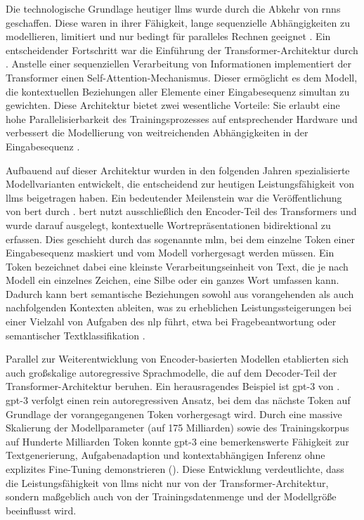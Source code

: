 Die technologische Grundlage heutiger \glspl{llm} wurde durch die Abkehr von \glspl{rnn} geschaffen.
Diese waren in ihrer Fähigkeit, lange sequenzielle Abhängigkeiten zu modellieren, limitiert und nur bedingt für paralleles Rechnen geeignet \autocite{vaswani_attention_2023}.
Ein entscheidender Fortschritt war die Einführung der Transformer-Architektur durch \citeauthor{vaswani_attention_2023} \autocite{vaswani_attention_2023}.
Anstelle einer sequenziellen Verarbeitung von Informationen implementiert der Transformer einen Self-Attention-Mechanismus.
Dieser ermöglicht es dem Modell, die kontextuellen Beziehungen aller Elemente einer Eingabesequenz simultan zu gewichten.
Diese Architektur bietet zwei wesentliche Vorteile: Sie erlaubt eine hohe Parallelisierbarkeit des Trainingsprozesses auf entsprechender Hardware und verbessert die Modellierung von weitreichenden Abhängigkeiten in der Eingabesequenz \autocite{vaswani_attention_2023}.

Aufbauend auf dieser Architektur wurden in den folgenden Jahren spezialisierte Modellvarianten entwickelt, die entscheidend zur heutigen Leistungsfähigkeit von \glspl{llm} beigetragen haben.
Ein bedeutender Meilenstein war die Veröffentlichung von \gls{bert} durch \citeauthor{devlin_bert_2019} \autocite{devlin_bert_2019}.
\gls{bert} nutzt ausschließlich den Encoder-Teil des Transformers und wurde darauf ausgelegt, kontextuelle Wortrepräsentationen bidirektional zu erfassen.
Dies geschieht durch das sogenannte \gls{mlm}, bei dem einzelne Token einer Eingabesequenz maskiert und vom Modell vorhergesagt werden müssen.
Ein Token bezeichnet dabei eine kleinste Verarbeitungseinheit von Text, die je nach Modell ein einzelnes Zeichen, eine Silbe oder ein ganzes Wort umfassen kann.
Dadurch kann \gls{bert} semantische Beziehungen sowohl aus vorangehenden als auch nachfolgenden Kontexten ableiten, was zu erheblichen Leistungssteigerungen bei einer Vielzahl von Aufgaben des \gls{nlp} führt, etwa bei Fragebeantwortung oder semantischer Textklassifikation \autocite{devlin_bert_2019}.

Parallel zur Weiterentwicklung von Encoder-basierten Modellen etablierten sich auch großskalige autoregressive Sprachmodelle, die auf dem Decoder-Teil der Transformer-Architektur beruhen.
Ein herausragendes Beispiel ist \gls{gpt}-3 von \citeauthor{brown_language_2020} \autocite{brown_language_2020}.
\gls{gpt}-3 verfolgt einen rein autoregressiven Ansatz, bei dem das nächste Token auf Grundlage der vorangegangenen Token vorhergesagt wird.
Durch eine massive Skalierung der Modellparameter (auf \num{175} Milliarden) sowie des Trainingskorpus auf Hunderte Milliarden Token konnte \gls{gpt}-3 eine bemerkenswerte Fähigkeit zur Textgenerierung, Aufgabenadaption und kontextabhängigen Inferenz ohne explizites Fine-Tuning demonstrieren ().
Diese Entwicklung verdeutlichte, dass die Leistungsfähigkeit von \glspl{llm} nicht nur von der Transformer-Architektur, sondern maßgeblich auch von der Trainingsdatenmenge und der Modellgröße beeinflusst wird.

